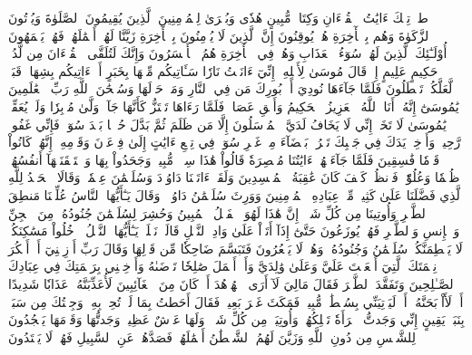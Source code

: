 طسٓۚ تِلۡكَ ءَايَٰتُ ٱلۡقُرۡءَانِ وَكِتَابٖ مُّبِينٍ
هُدٗى وَبُشۡرَىٰ لِلۡمُؤۡمِنِينَ
ٱلَّذِينَ يُقِيمُونَ ٱلصَّلَوٰةَ وَيُؤۡتُونَ ٱلزَّكَوٰةَ وَهُم بِٱلۡأٓخِرَةِ هُمۡ يُوقِنُونَ
إِنَّ ٱلَّذِينَ لَا يُؤۡمِنُونَ بِٱلۡأٓخِرَةِ زَيَّنَّا لَهُمۡ أَعۡمَٰلَهُمۡ فَهُمۡ يَعۡمَهُونَ
أُوْلَـٰٓئِكَ ٱلَّذِينَ لَهُمۡ سُوٓءُ ٱلۡعَذَابِ وَهُمۡ فِي ٱلۡأٓخِرَةِ هُمُ ٱلۡأَخۡسَرُونَ
وَإِنَّكَ لَتُلَقَّى ٱلۡقُرۡءَانَ مِن لَّدُنۡ حَكِيمٍ عَلِيمٍ
إِذۡ قَالَ مُوسَىٰ لِأَهۡلِهِۦٓ إِنِّيٓ ءَانَسۡتُ نَارٗا سَـَٔاتِيكُم مِّنۡهَا بِخَبَرٍ أَوۡ ءَاتِيكُم بِشِهَابٖ قَبَسٖ لَّعَلَّكُمۡ تَصۡطَلُونَ
فَلَمَّا جَآءَهَا نُودِيَ أَنۢ بُورِكَ مَن فِي ٱلنَّارِ وَمَنۡ حَوۡلَهَا وَسُبۡحَٰنَ ٱللَّهِ رَبِّ ٱلۡعَٰلَمِينَ
يَٰمُوسَىٰٓ إِنَّهُۥٓ أَنَا ٱللَّهُ ٱلۡعَزِيزُ ٱلۡحَكِيمُ
وَأَلۡقِ عَصَاكَۚ فَلَمَّا رَءَاهَا تَهۡتَزُّ كَأَنَّهَا جَآنّٞ وَلَّىٰ مُدۡبِرٗا وَلَمۡ يُعَقِّبۡۚ يَٰمُوسَىٰ لَا تَخَفۡ إِنِّي لَا يَخَافُ لَدَيَّ ٱلۡمُرۡسَلُونَ
إِلَّا مَن ظَلَمَ ثُمَّ بَدَّلَ حُسۡنَۢا بَعۡدَ سُوٓءٖ فَإِنِّي غَفُورٞ رَّحِيمٞ
وَأَدۡخِلۡ يَدَكَ فِي جَيۡبِكَ تَخۡرُجۡ بَيۡضَآءَ مِنۡ غَيۡرِ سُوٓءٖۖ فِي تِسۡعِ ءَايَٰتٍ إِلَىٰ فِرۡعَوۡنَ وَقَوۡمِهِۦٓۚ إِنَّهُمۡ كَانُواْ قَوۡمٗا فَٰسِقِينَ
فَلَمَّا جَآءَتۡهُمۡ ءَايَٰتُنَا مُبۡصِرَةٗ قَالُواْ هَٰذَا سِحۡرٞ مُّبِينٞ
وَجَحَدُواْ بِهَا وَٱسۡتَيۡقَنَتۡهَآ أَنفُسُهُمۡ ظُلۡمٗا وَعُلُوّٗاۚ فَٱنظُرۡ كَيۡفَ كَانَ عَٰقِبَةُ ٱلۡمُفۡسِدِينَ
وَلَقَدۡ ءَاتَيۡنَا دَاوُۥدَ وَسُلَيۡمَٰنَ عِلۡمٗاۖ وَقَالَا ٱلۡحَمۡدُ لِلَّهِ ٱلَّذِي فَضَّلَنَا عَلَىٰ كَثِيرٖ مِّنۡ عِبَادِهِ ٱلۡمُؤۡمِنِينَ
وَوَرِثَ سُلَيۡمَٰنُ دَاوُۥدَۖ وَقَالَ يَـٰٓأَيُّهَا ٱلنَّاسُ عُلِّمۡنَا مَنطِقَ ٱلطَّيۡرِ وَأُوتِينَا مِن كُلِّ شَيۡءٍۖ إِنَّ هَٰذَا لَهُوَ ٱلۡفَضۡلُ ٱلۡمُبِينُ
وَحُشِرَ لِسُلَيۡمَٰنَ جُنُودُهُۥ مِنَ ٱلۡجِنِّ وَٱلۡإِنسِ وَٱلطَّيۡرِ فَهُمۡ يُوزَعُونَ
حَتَّىٰٓ إِذَآ أَتَوۡاْ عَلَىٰ وَادِ ٱلنَّمۡلِ قَالَتۡ نَمۡلَةٞ يَـٰٓأَيُّهَا ٱلنَّمۡلُ ٱدۡخُلُواْ مَسَٰكِنَكُمۡ لَا يَحۡطِمَنَّكُمۡ سُلَيۡمَٰنُ وَجُنُودُهُۥ وَهُمۡ لَا يَشۡعُرُونَ
فَتَبَسَّمَ ضَاحِكٗا مِّن قَوۡلِهَا وَقَالَ رَبِّ أَوۡزِعۡنِيٓ أَنۡ أَشۡكُرَ نِعۡمَتَكَ ٱلَّتِيٓ أَنۡعَمۡتَ عَلَيَّ وَعَلَىٰ وَٰلِدَيَّ وَأَنۡ أَعۡمَلَ صَٰلِحٗا تَرۡضَىٰهُ وَأَدۡخِلۡنِي بِرَحۡمَتِكَ فِي عِبَادِكَ ٱلصَّـٰلِحِينَ
وَتَفَقَّدَ ٱلطَّيۡرَ فَقَالَ مَالِيَ لَآ أَرَى ٱلۡهُدۡهُدَ أَمۡ كَانَ مِنَ ٱلۡغَآئِبِينَ
لَأُعَذِّبَنَّهُۥ عَذَابٗا شَدِيدًا أَوۡ لَأَاْذۡبَحَنَّهُۥٓ أَوۡ لَيَأۡتِيَنِّي بِسُلۡطَٰنٖ مُّبِينٖ
فَمَكَثَ غَيۡرَ بَعِيدٖ فَقَالَ أَحَطتُ بِمَا لَمۡ تُحِطۡ بِهِۦ وَجِئۡتُكَ مِن سَبَإِۭ بِنَبَإٖ يَقِينٍ
إِنِّي وَجَدتُّ ٱمۡرَأَةٗ تَمۡلِكُهُمۡ وَأُوتِيَتۡ مِن كُلِّ شَيۡءٖ وَلَهَا عَرۡشٌ عَظِيمٞ
وَجَدتُّهَا وَقَوۡمَهَا يَسۡجُدُونَ لِلشَّمۡسِ مِن دُونِ ٱللَّهِ وَزَيَّنَ لَهُمُ ٱلشَّيۡطَٰنُ أَعۡمَٰلَهُمۡ فَصَدَّهُمۡ عَنِ ٱلسَّبِيلِ فَهُمۡ لَا يَهۡتَدُونَ
